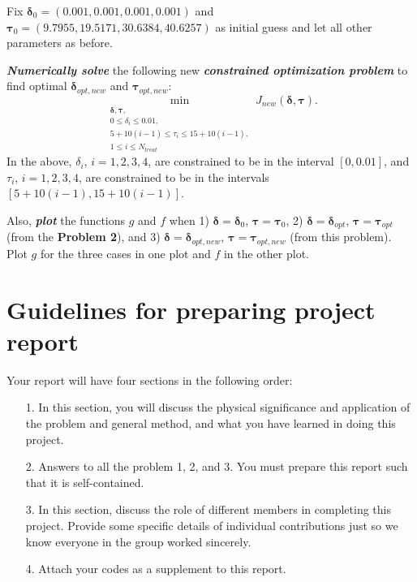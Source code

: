 \documentclass[11pt,a4paper]{article}
\newcommand{\bolds}[1]{\boldsymbol{#1}}
\newcommand{\bfit}[1]{\textit{\textbf{#1}}}
\begin{document}
Fix $\bolds{\delta}_0  = (0.001, 0.001, 0.001, 0.001)$ and $\bolds{\tau}_0 = (9.7955, 19.5171, 30.6384, 40.6257)$ as initial guess and let all other parameters as before. 

 \bfit{Numerically solve} the following new \bfit{constrained optimization problem} to find optimal $\bolds{\delta}_{opt, new}$ and $\bolds{\tau}_{opt, new}$:
\begin{equation}\label{eq:optProb2}
 \min_{\substack{\bolds{\delta}, \bolds{\tau},\\
0 \leq \delta_i \leq 0.01, \\
5 + 10(i-1) \leq \tau_i \leq 15 + 10(i-1), \\
1\leq i \leq N_{treat}}} J_{new}(\bolds{\delta}, \bolds{\tau}) .
\end{equation}
In the above, $\delta_i$, $i=1,2,3,4$, are constrained to be in the interval $[0, 0.01]$, and $\tau_i$, $i=1,2,3,4$, are constrained to be in the intervals $[5+10(i-1), 15+10(i-1)]$.

Also, \bfit{plot} the functions $g$ and $f$ when 1) $\bolds{\delta} = \bolds{\delta}_0$, $\bolds{\tau} = \bolds{\tau}_0$, 2)  $\bolds{\delta} = \bolds{\delta}_{opt}$, $\bolds{\tau} = \bolds{\tau}_{opt}$ (from the \textbf{Problem 2}), and 3) $\bolds{\delta} = \bolds{\delta}_{opt, new}$, $\bolds{\tau} = \bolds{\tau}_{opt, new}$ (from this problem).  Plot $g$ for the three cases in one plot and $f$  in the other plot. 

\section{Guidelines for preparing project report} 
Your report will have four sections in the following order:
\begin{itemize}
\item[1.] In this section, you will discuss the physical significance and application of the problem and general method, and what you have learned in doing this project.
\item[2.] Answers to all the problem 1, 2, and 3. You must prepare this report such that it is self-contained. 
\item[3.] In this section, discuss the role of different members in completing this project. Provide some specific details of individual contributions just so we know everyone in the group worked sincerely. 
\item[4.] Attach your codes as a supplement to this report.
\end{itemize}
\end{document}
